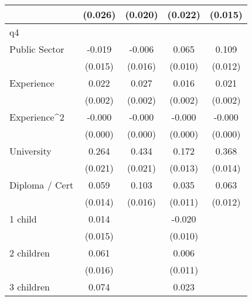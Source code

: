 {\begin{tabular}{l*{4}{c}}
                    &     (0.026)         &     (0.020)         &     (0.022)         &     (0.015)         \\
\hline
q4                  &                     &                     &                     &                     \\
Public Sector       &      -0.019         &      -0.006         &       0.065\sym{***}&       0.109\sym{***}\\
                    &     (0.015)         &     (0.016)         &     (0.010)         &     (0.012)         \\
[1em]
Experience          &       0.022\sym{***}&       0.027\sym{***}&       0.016\sym{***}&       0.021\sym{***}\\
                    &     (0.002)         &     (0.002)         &     (0.002)         &     (0.002)         \\
[1em]
Experience^{2}      &      -0.000\sym{***}&      -0.000\sym{***}&      -0.000\sym{***}&      -0.000\sym{***}\\
                    &     (0.000)         &     (0.000)         &     (0.000)         &     (0.000)         \\
[1em]
University          &       0.264\sym{***}&       0.434\sym{***}&       0.172\sym{***}&       0.368\sym{***}\\
                    &     (0.021)         &     (0.021)         &     (0.013)         &     (0.014)         \\
[1em]
Diploma / Cert      &       0.059\sym{***}&       0.103\sym{***}&       0.035\sym{**} &       0.063\sym{***}\\
                    &     (0.014)         &     (0.016)         &     (0.011)         &     (0.012)         \\
[1em]
1 child             &       0.014         &                     &      -0.020\sym{*}  &                     \\
                    &     (0.015)         &                     &     (0.010)         &                     \\
[1em]
2 children          &       0.061\sym{***}&                     &       0.006         &                     \\
                    &     (0.016)         &                     &     (0.011)         &                     \\
[1em]
3 children          &       0.074\sym{**} &                     &       0.023         &                     \\

\end{tabular}}
